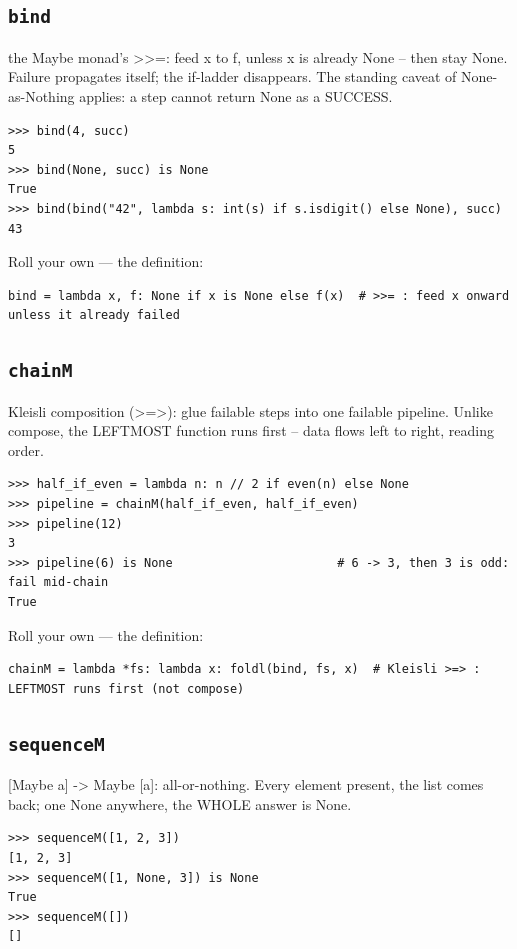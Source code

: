 \documentclass[10pt,letterpaper]{book}
\begin{document}
\subsection{\texttt{bind}}\label{def:bind}
the Maybe monad's >>=: feed x to f, unless x is already None -- then stay None. Failure propagates itself; the if-ladder disappears. The standing caveat of None-as-Nothing applies: a step cannot return None as a SUCCESS.
\begin{lstlisting}[style=ex]
>>> bind(4, succ)
5
>>> bind(None, succ) is None
True
>>> bind(bind("42", lambda s: int(s) if s.isdigit() else None), succ)
43
\end{lstlisting}

Roll your own --- the definition:

\begin{lstlisting}[style=ex]
bind = lambda x, f: None if x is None else f(x)  # >>= : feed x onward unless it already failed
\end{lstlisting}
\subsection{\texttt{chainM}}\label{def:chainM}
Kleisli composition (>=>): glue failable steps into one failable pipeline. Unlike compose, the LEFTMOST function runs first -- data flows left to right, reading order.
\begin{lstlisting}[style=ex]
>>> half_if_even = lambda n: n // 2 if even(n) else None
>>> pipeline = chainM(half_if_even, half_if_even)
>>> pipeline(12)
3
>>> pipeline(6) is None                       # 6 -> 3, then 3 is odd: fail mid-chain
True
\end{lstlisting}

Roll your own --- the definition:

\begin{lstlisting}[style=ex]
chainM = lambda *fs: lambda x: foldl(bind, fs, x)  # Kleisli >=> : LEFTMOST runs first (not compose)
\end{lstlisting}
\subsection{\texttt{sequenceM}}\label{def:sequenceM}
[Maybe a] -> Maybe [a]: all-or-nothing. Every element present, the list comes back; one None anywhere, the WHOLE answer is None.
\begin{lstlisting}[style=ex]
>>> sequenceM([1, 2, 3])
[1, 2, 3]
>>> sequenceM([1, None, 3]) is None
True
>>> sequenceM([])
[]
\end{lstlisting}
\end{document}
